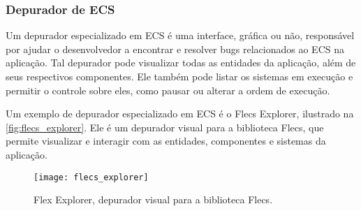 \subsubsection{Depurador de ECS}

Um depurador especializado em ECS é uma interface, gráfica ou não, responsável por ajudar o desenvolvedor a encontrar e resolver bugs relacionados ao ECS na aplicação. Tal depurador pode visualizar todas as entidades da aplicação, além  de seus respectivos componentes. Ele também pode listar os sistemas em execução e permitir o controle sobre eles, como pausar ou alterar a ordem de execução.

Um exemplo de depurador especializado em ECS é o Flecs Explorer, ilustrado na \autoref{fig:flecs_explorer}. Ele é um depurador visual para a biblioteca Flecs, que permite visualizar e interagir com as entidades, componentes e sistemas da aplicação.

\begin{figure}[H]
	\centering
	\texttt{[image: flecs\_explorer]}
	\caption{Flex Explorer, depurador visual para a biblioteca Flecs.}
	\label{fig:flecs_explorer}
\end{figure}
